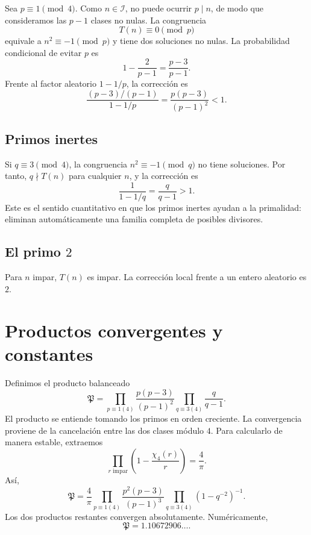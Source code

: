 \documentclass[11pt,a4paper,openany]{report}
\newcommand{\Iset}{\mathcal{I}}
\begin{document}
Sea \(p\equiv1\pmod4\). Como \(n\in\Iset\), no puede ocurrir \(p\mid n\), de modo que consideramos las \(p-1\) clases no nulas. La congruencia
\[
 T(n)\equiv0\pmod p
\]
equivale a \(n^2\equiv-1\pmod p\) y tiene dos soluciones no nulas. La probabilidad condicional de evitar \(p\) es
\[
 1-\frac{2}{p-1}=\frac{p-3}{p-1}.
\]
Frente al factor aleatorio \(1-1/p\), la corrección es
\begin{equation}
 \frac{(p-3)/(p-1)}{1-1/p}
 =\frac{p(p-3)}{(p-1)^2}<1.
 \label{eq:split-local}
\end{equation}

\subsection{Primos inertes}

Si \(q\equiv3\pmod4\), la congruencia \(n^2\equiv-1\pmod q\) no tiene soluciones. Por tanto, \(q\nmid T(n)\) para cualquier \(n\), y la corrección es
\begin{equation}
 \frac1{1-1/q}=\frac{q}{q-1}>1.
 \label{eq:inert-local}
\end{equation}
Este es el sentido cuantitativo en que los primos inertes ayudan a la primalidad: eliminan automáticamente una familia completa de posibles divisores.

\subsection{El primo \(2\)}

Para \(n\) impar, \(T(n)\) es impar. La corrección local frente a un entero aleatorio es \(2\).

\section{Productos convergentes y constantes}

Definimos el producto balanceado
\begin{equation}
 \mathfrak P=
 \prod_{p\equiv1(4)}\frac{p(p-3)}{(p-1)^2}
 \prod_{q\equiv3(4)}\frac{q}{q-1}.
 \label{eq:Pbalance}
\end{equation}
El producto se entiende tomando los primos en orden creciente. La convergencia proviene de la cancelación entre las dos clases módulo \(4\). Para calcularlo de manera estable, extraemos
\[
 \prod_{r\text{ impar}}\left(1-\frac{\chi_4(r)}r\right)
 =\frac4\pi.
\]
Así,
\begin{equation}
 \boxed{
 \mathfrak P=\frac4\pi
 \prod_{p\equiv1(4)}\frac{p^2(p-3)}{(p-1)^3}
 \prod_{q\equiv3(4)}(1-q^{-2})^{-1}.}
 \label{eq:P-accelerated}
\end{equation}
Los dos productos restantes convergen absolutamente. Numéricamente,
\begin{equation}
 \boxed{\mathfrak P=1.10672906\ldots.}
 \label{eq:P-value}
\end{equation}
\end{document}
